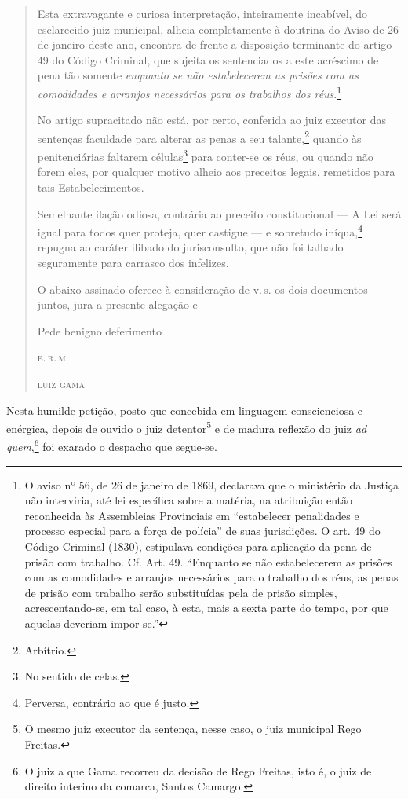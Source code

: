 \begin{quote}
Esta extravagante e curiosa interpretação, inteiramente incabível, do
esclarecido juiz municipal, alheia completamente à doutrina do Aviso de
26 de janeiro deste ano, encontra de frente a disposição terminante do
artigo 49 do Código Criminal, que sujeita os sentenciados a este
acréscimo de pena tão somente \emph{enquanto se não estabelecerem as
prisões com as comodidades e arranjos necessários para os trabalhos dos
réus}.\footnote{O aviso nº 56, de 26 de janeiro de 1869, declarava que o
  ministério da Justiça não interviria, até lei específica sobre a
  matéria, na atribuição então reconhecida às Assembleias Provinciais em
  ``estabelecer penalidades e processo especial para a força de polícia''
  de suas jurisdições. O art. 49 do Código Criminal (1830), estipulava
  condições para aplicação da pena de prisão com trabalho. Cf. Art. 49.
  ``Enquanto se não estabelecerem as prisões com as comodidades e
  arranjos necessários para o trabalho dos réus, as penas de prisão com
  trabalho serão substituídas pela de prisão simples, acrescentando-se,
  em tal caso, à esta, mais a sexta parte do tempo, por que aquelas
  deveriam impor-se.''}

No artigo supracitado não está, por certo, conferida ao juiz executor
das sentenças faculdade para alterar as penas a seu talante,\footnote{
  Arbítrio.} quando às penitenciárias faltarem células\footnote{No
  sentido de celas.} para conter-se os réus, ou quando não forem eles,
por qualquer motivo alheio aos preceitos legais, remetidos para tais
Estabelecimentos.

Semelhante ilação odiosa, contrária ao preceito constitucional --- A Lei
será igual para todos quer proteja, quer castigue --- e sobretudo
iníqua,\footnote{Perversa, contrário ao que é justo.} repugna ao
caráter ilibado do jurisconsulto, que não foi talhado seguramente para
carrasco dos infelizes.

O abaixo assinado oferece à consideração de v.\,s. os dois documentos
juntos, jura a presente alegação e

\begin{flushright}
Pede benigno deferimento

\textsc{e.\,r.\,m.}

\textsc{luiz gama}
\end{flushright}
\end{quote}

Nesta humilde petição, posto que concebida em linguagem conscienciosa e
enérgica, depois de ouvido o juiz detentor\footnote{O mesmo juiz
  executor da sentença, nesse caso, o juiz municipal Rego Freitas.} e de
madura reflexão do juiz \emph{ad quem},\footnote{O juiz a que Gama
  recorreu da decisão de Rego Freitas, isto é, o juiz de direito
  interino da comarca, Santos Camargo.} foi exarado o despacho que
segue-se.

